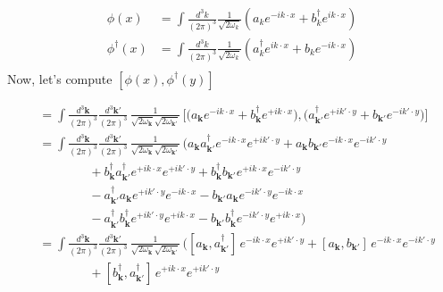 \documentclass[12pt]{article}
\newcommand{\+}{\dagger}
\begin{document}
\begin{align*}
   \phi(x) &= \int \frac{d^3k}{(2\pi)^3} \frac{1}{\sqrt{2\omega_k}} \left(
   a_k e^{-ik\cdot x} + b_k^{\dagger}e^{ik\cdot x}
   \right) \\
   \phi^{\dagger}(x) &= \int \frac{d^3k}{(2\pi)^3} \frac{1}{\sqrt{2\omega_k}}
   \left( a^{\dagger}_k e^{ik\cdot x} + b_k e^{-ik\cdot x} \right) \\
\end{align*}
Now, let's compute $[\phi(x), \phi^{\dagger}(y)]$

\begin{align*}
   [\phi(x),\phi^\dagger(y)]
   &=\int \frac{d^3\mathbf{k}}{(2\pi)^3}
          \frac{d^3\mathbf{k}'}{(2\pi)^3}\,
          \frac{1}{\sqrt{2\omega_{\mathbf{k}}}
                   \sqrt{2\omega_{\mathbf{k}'}}}\,
   \Big[
     \big(a_{\mathbf{k}} e^{-ik\cdot x}
      + b_{\mathbf{k}}^\dagger e^{+ik\cdot x}\big),
     \big(a_{\mathbf{k}'}^\dagger e^{+ik'\cdot y}
      + b_{\mathbf{k}'} e^{-ik'\cdot y}\big)
   \Big] \\[6pt]
   &=\int \frac{d^3\mathbf{k}}{(2\pi)^3}
           \frac{d^3\mathbf{k}'}{(2\pi)^3}\,
           \frac{1}{\sqrt{2\omega_{\mathbf{k}}}
                    \sqrt{2\omega_{\mathbf{k}'}}}\,
   \Big(
     a_{\mathbf{k}} a_{\mathbf{k}'}^\dagger e^{-ik\cdot x} e^{+ik'\cdot y}
    +a_{\mathbf{k}} b_{\mathbf{k}'} e^{-ik\cdot x} e^{-ik'\cdot y} \\
   &\qquad\qquad
    +b_{\mathbf{k}}^\dagger a_{\mathbf{k}'}^\dagger e^{+ik\cdot x} e^{+ik'\cdot y}
    +b_{\mathbf{k}}^\dagger b_{\mathbf{k}'} e^{+ik\cdot x} e^{-ik'\cdot y} \\
   &\qquad\qquad
    -a_{\mathbf{k}'}^\dagger a_{\mathbf{k}} e^{+ik'\cdot y} e^{-ik\cdot x}
    -b_{\mathbf{k}'} a_{\mathbf{k}} e^{-ik'\cdot y} e^{-ik\cdot x} \\
   &\qquad\qquad
    -a_{\mathbf{k}'}^\dagger b_{\mathbf{k}}^\dagger e^{+ik'\cdot y} e^{+ik\cdot x}
    -b_{\mathbf{k}'} b_{\mathbf{k}}^\dagger e^{-ik'\cdot y} e^{+ik\cdot x}
   \Big) \\[6pt]
   &=\int \frac{d^3\mathbf{k}}{(2\pi)^3}
           \frac{d^3\mathbf{k}'}{(2\pi)^3}\,
           \frac{1}{\sqrt{2\omega_{\mathbf{k}}}
                    \sqrt{2\omega_{\mathbf{k}'}}}\,
   \Big(
    [a_{\mathbf{k}},a_{\mathbf{k}'}^\dagger]\,e^{-ik\cdot x}e^{+ik'\cdot y}
    +[a_{\mathbf{k}},b_{\mathbf{k}'}]\,e^{-ik\cdot x}e^{-ik'\cdot y} \\
   &\qquad\qquad
    +[b_{\mathbf{k}}^\dagger,a_{\mathbf{k}'}^\dagger]\,e^{+ik\cdot x}e^{+ik'\cdot y}

\end{align*}
\end{document}

